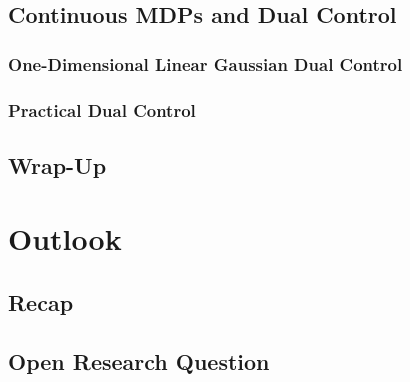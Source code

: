 	\section{Continuous MDPs and Dual Control} %

		\subsection{One-Dimensional Linear Gaussian Dual Control} %

		\subsection{Practical Dual Control} %

	\section{Wrap-Up} %

\chapter{Outlook} %

	\section{Recap} %

	\section{Open Research Question} %
